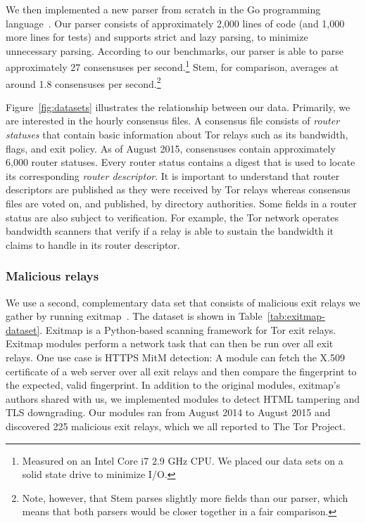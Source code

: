 We then implemented a new parser from scratch in the Go programming
language~\cite{zoossh}.  Our parser consists of approximately 2,000 lines of
code (and 1,000 more lines for tests) and supports strict and lazy parsing, to
minimize unnecessary parsing.  According to our benchmarks, our parser is able
to parse approximately 27 consensuses per second.\footnote{Measured on an Intel
Core i7 2.9 GHz CPU.  We placed our data sets on a solid state drive to
minimize I/O.}  Stem, for comparison, averages at around 1.8 consensuses per
second.\footnote{Note, however, that Stem parses slightly more fields than our
parser, which means that both parsers would be closer together in a fair
comparison.}

Figure~\ref{fig:datasets} illustrates the relationship between our data.
Primarily, we are interested in the hourly consensus files.  A consensus file
consists of \emph{router statuses} that contain basic information about Tor
relays such as its bandwidth, flags, and exit policy.  As of August 2015,
consensuses contain approximately 6,000 router statuses.  Every router status
contains a digest that is used to locate its corresponding \emph{router
descriptor}.  It is important to understand that router descriptors are
published as they were received by Tor relays whereas consensus files are voted
on, and published, by directory authorities.  Some fields in a router status
are also subject to verification.  For example, the Tor network operates
bandwidth scanners that verify if a relay is able to sustain the bandwidth it
claims to handle in its router descriptor.

\subsubsection{Malicious relays}
We use a second, complementary data set that consists of malicious exit relays
we gather by running exitmap~\cite[\S 3.1]{Winter2014a}.  The dataset is shown
in Table~\ref{tab:exitmap-dataset}.  Exitmap is a Python-based scanning
framework for Tor exit relays.  Exitmap modules perform a network task that can
then be run over all exit relays.  One use case is HTTPS MitM detection: A
module can fetch the X.509 certificate of a web server over all exit relays and
then compare the fingerprint to the expected, valid fingerprint.  In addition to
the original modules, exitmap's authors shared with us, we implemented modules
to detect HTML tampering and TLS downgrading.  Our modules ran from August 2014
to August 2015 and discovered 225 malicious exit relays, which we all reported
to The Tor Project.

